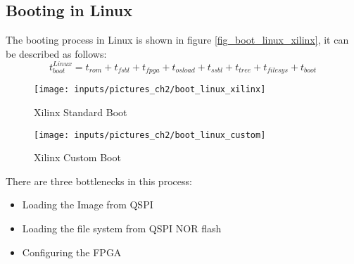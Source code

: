 \subsection{Booting in Linux}\label{ss_booting_in_linux}
The booting process in Linux is shown in figure \ref{fig_boot_linux_xilinx}, it can be described as follows:
\begin{equation}
t_{boot}^{Linux} = t_{rom} + t_{fsbl} +  t_{fpga} + t_{osload} +  t_{ssbl} + t_{tree} + t_{filesys} + t_{boot}
\label{eq_t_boot_linux} 
\end{equation}

\begin{figure}[htb]
	\begin{center}
	\begin{minipage}[bth]{6,8cm}
		\begin{center}
			\texttt{[image: inputs/pictures\_ch2/boot\_linux\_xilinx]}
			\caption[Xilinx Standard Boot]{Xilinx Standard Boot \cite{xilinx:zbff}}
		\end{center}	
	\end{minipage}\label{fig_boot_linux_xilinx}
	\hspace{0,5cm}
	\begin{minipage}[bth]{6,8cm}
		\begin{center}
			\texttt{[image: inputs/pictures\_ch2/boot\_linux\_custom]}
			\caption[Xilinx Standard Boot]{Xilinx Custom Boot \cite{xilinx:zbff}} 
		\end{center}
	\end{minipage}\label{fig_boot_linux_custom}
	\end{center}
\end{figure}

There are three bottlenecks in this process:
\begin{itemize}
	\item Loading the Image from \ac{QSPI}
	\item Loading the file system from \ac{QSPI} NOR flash
	\item Configuring the \ac{FPGA}
\end{itemize}

